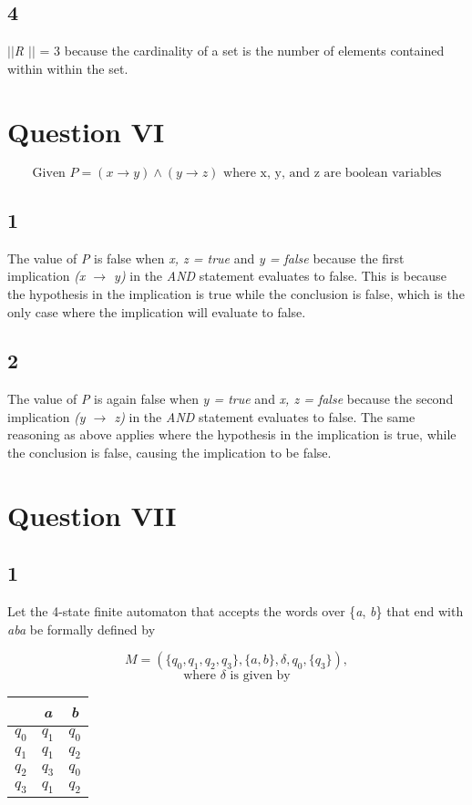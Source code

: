 \documentclass{article}
\begin{document}
\subsection{4}
\textit{$\vert\vert$R $\vert\vert$} = 3 because the cardinality of a set is the number of elements contained within within the set.

\section*{Question VI}

\[ \textrm{Given } P = (x \rightarrow y) \land (y \rightarrow z) \textrm{ where x, y, and z are boolean variables}\]

\subsection{1} 
The value of \textit{P} is false when \textit{x, z = true} and \textit{y = false} because the first implication \textit{(x $\rightarrow$ y)} in the \textit{AND} statement evaluates to false. This is because the hypothesis in the implication is true while the conclusion is false, which is the only case where the implication will evaluate to false.

\subsection{2} 
The value of \textit{P} is again false when \textit{y = true} and \textit{x, z = false} because the second implication \textit{(y $\rightarrow$ z)} in the \textit{AND} statement evaluates to false. The same reasoning as above applies where the hypothesis in the implication is true, while the conclusion is false, causing the implication to be false.

\section*{Question VII}

\subsection{1} 

Let the 4-state finite automaton that accepts the words over \{\textit{a}, \textit{b}\} that end with \textit{aba} be formally defined by

\[
M = \left(\{q_0, q_1, q_2, q_3\}, \{\textit{a},
\textit{b}\}, \delta, q_0, \{q_3\} \right),
\]
\[\textrm{where } \delta \textrm{ is given by} \] 
\begin{center}
    \begin{tabular}{c|cc}
    & \textit{a} & \textit{b}\\ \hline
    $q_0$ & $q_1$ & $q_0$ \\
    $q_1$ & $q_1$ & $q_2$ \\
    $q_2$ & $q_3$ & $q_0$ \\
    $q_3$ & $q_1$ & $q_2$
    \end{tabular}
\end{center}
\end{document}
